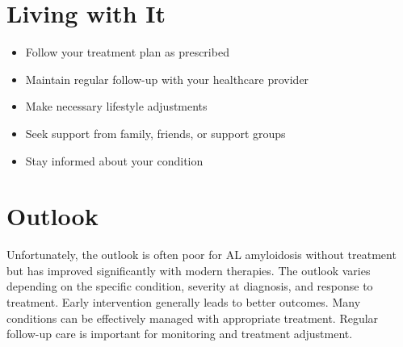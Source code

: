 \section{Living with It}
\begin{itemize}[noitemsep]
  \item Follow your treatment plan as prescribed
  \item Maintain regular follow-up with your healthcare provider
  \item Make necessary lifestyle adjustments
  \item Seek support from family, friends, or support groups
  \item Stay informed about your condition
\end{itemize}
\section{Outlook}
Unfortunately, the outlook is often poor for AL amyloidosis without treatment but has improved significantly with modern therapies. The outlook varies depending on the specific condition, severity at diagnosis, and response to treatment. Early intervention generally leads to better outcomes. Many conditions can be effectively managed with appropriate treatment. Regular follow-up care is important for monitoring and treatment adjustment.
